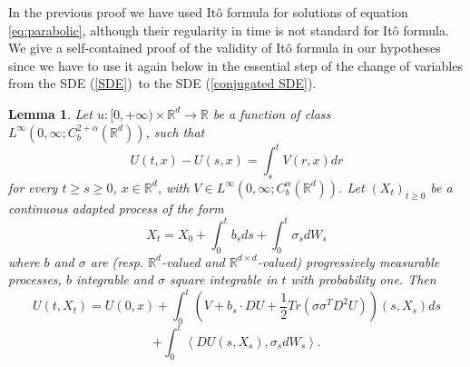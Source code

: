 \documentclass[a4paper,11pt]{article}
\newtheorem{lemma}[theorem]{Lemma}
\begin{document}
In the previous proof we have used It\^{o} formula for solutions of equation %
\eqref{eq:parabolic}, although their regularity in time is not standard for
It\^{o} formula. We give a self-contained proof of the validity of It\^{o} formula in our hypotheses since we have to use it again below in the essential step of the
change of variables from the SDE (\ref{SDE})\ to the SDE (\ref{conjugated
SDE}).

\begin{lemma}
\label{lemma formula Ito}Let $u:[0,+\infty )\times {\mathbb{R}}%
^{d}\rightarrow {\mathbb{R}}$ be a function of class $L^{\infty }\left(
0,\infty ;C_{b}^{2+\alpha }({\mathbb{R}}^{d})\right) $, such that
\begin{equation}
U\left( t,x\right) -U\left( s,x\right) =\int_{s}^{t}V\left( r,x\right) dr
\label{U V}
\end{equation}
for every $t\geq s\geq 0$, $x\in {\mathbb{R}}^{d}$, with $V\in L^{\infty
}\left( 0,\infty ;C_{b}^{\alpha }({\mathbb{R}}^{d})\right) $. Let $\left(
X_{t}\right) _{t\geq 0}$ be a continuous adapted process of the form
\begin{equation*}
X_{t}=X_{0}+\int_{0}^{t}b_{s}ds+\int_{0}^{t}\sigma _{s}dW_{s}
\end{equation*}
where $b$ and $\sigma $ are (resp. ${\mathbb{R}}^{d}$-valued and ${\mathbb{R}%
}^{d\times d}$-valued) progressively measurable processes, $b$ integrable
and $\sigma $ square integrable in $t$ with probability one. Then
\begin{equation*}
U\left( t,X_{t}\right) =U\left( 0,x\right) +\int_{0}^{t}\left( V+b_{s}\cdot
DU+\frac{1}{2}Tr\left( \sigma \sigma ^{T}D^{2}U\right) \right) \left(
s,X_{s}\right) ds
\end{equation*}
\begin{equation}
+\int_{0}^{t}\left\langle DU\left( s,X_{s}\right) ,\sigma
_{s}dW_{s}\right\rangle .  \label{Ito generalized}
\end{equation}
\end{lemma}
\end{document}
